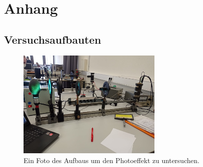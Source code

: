 \newpage
\section{Anhang}

\subsection{Versuchsaufbauten}
\begin{figure}[H]
    \centering
    \includegraphics[width=0.63\textwidth]{latex/images/Aufbau_Photoeffekt.jpeg}
    \caption{Ein Foto des Aufbaus um den Photoeffekt zu untersuchen.}
    \label{img:aufbau}
\end{figure}

